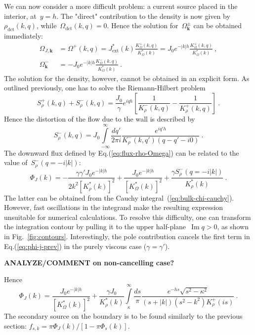 \documentclass[preprint,aps,eqsecnum, prb]{revtex4-1}
\newcommand{\fplus}[1]{{#1}^{+}}
\newcommand{\fminus}[1]{{#1}^{-}}
\newcommand{\fplusminus}[1]{{#1}^{\pm}}
\renewcommand{\Im}{\mathop{\mathrm{Im}}\nolimits}
\newcommand{\dct}[1]{{#1}_\mathrm{dct}}
\begin{document}
We can now consider a more difficult problem: a current source placed
in the interior, at~$y = h$. The "direct" contribution to the density is now given
by~$\dct{\rho}(k, q)$, while~$\dct{\Omega}(k, q) = 0$. Hence the solution
for~$\fplusminus{\Omega}_{\bm k}$ can be obtained immediately:
\begin{align}
\Omega_{J, {\bm k}} &=  \fplus{\Omega}(k, q)
= J_\mathrm{ext}^\ast(k) \frac{\fplus{K}_\Omega(k, q)}{K_\Omega^\ast(k)}
= J_0 e^{-|k|h} \frac{\fplus{K}_\Omega(k, q)}{K_\Omega^\ast(k)}
\ ,
\\
\fminus{\Omega}_{\bm k}
&= - J_0 e^{-|k|h} \frac{\fminus{K}_\Omega(k, q)}{K_\Omega^\ast(k)}
\ .
\end{align}
The solution for the density, however, cannot be obtained in an explicit form.
As outlined previously, one has to solve the Riemann-Hilbert problem
\begin{equation}
  \fplus{S}_\rho(k, q) + \fminus{S}_\rho(k, q) = \frac{J_0}{\gamma} e^{iqh}
  \left[\frac{1}{\fminus{K}_\rho(k, q)} -
  \frac{1}{\fplus{K}_\rho(k, q)} \right]
  \ .
\end{equation}
Hence the distortion of the flow due to the wall is described by
\begin{equation}
  \label{eq:bulk-chi-cauchy}
  \fminus{S}_\rho(k, q) = J_0 \int\limits_{-\infty}^{\infty}
  \frac{dq'}{2\pi i} \frac{e^{iq'h}}{\fminus{K}_\rho(k, q') (q - q' - i0)}
  \ .
\end{equation}
The downward flux defined by Eq.(\ref{eq:flux-rho-Omega}) can be related
to the value of~$\fminus{S}_\rho(q = -i|k|)$:
\begin{equation}
  \label{eq:phi-j-prev}
\Phi_J(k) = - \frac{\gamma \gamma' J_0 e^{-|k|h}}{2k^2 \left[K_\rho^\ast(k)\right]^2}
+ \frac{J_0 e^{-|k|h}}{\left[K_\Omega^\ast(k)\right]^2}
+ \frac{\gamma \fminus{S}_\rho(q=-i|k|)}{K_\rho^\ast(k)}
\ .
\end{equation}
The latter can be obtained from the Cauchy integral~(\ref{eq:bulk-chi-cauchy}).
However, fast oscillations in the integrand make the resulting expression
unsuitable for numerical calculations. To resolve this difficulty, one can
transform the integration contour by pulling it to
the upper half-plane~$\Im q > 0$, as shown in Fig.~\ref{fig:contours}.
Interestingly, the pole contribution cancels the first term in Eq.(\ref{eq:phi-j-prev}) in the purely viscous case ($\gamma = \gamma'$).


{\bf ANALYZE/COMMENT on non-cancelling case?}

Hence
\begin{equation}
\Phi_J(k) =
 \frac{J_0 e^{-|k|h}}{\left[K_\Omega^\ast(k)\right]^2}
 + \frac{\gamma J_0}{K_\rho^\ast(k)}
   \int\limits_{\kappa}^{\infty} \frac{ds}{\pi}
   \frac{e^{-hs} \sqrt{s^2 - \kappa^2}}{(s + |k|) (s^2 - k^2) \fplus{K}_\rho(is)}
   \ .
\end{equation}
The secondary source on the boundary is to be found similarly to the previous
section: $f_{s, k} = \pi \Phi_J(k)/\left[1 - \pi \Phi_s(k)\right]$.
\end{document}
